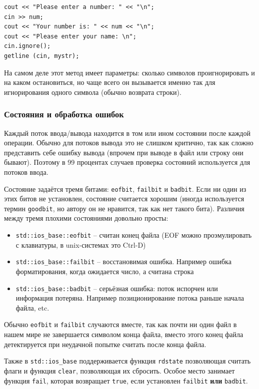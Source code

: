 \documentclass[a4paper,12pt,oneside]{article}
\begin{document}
\begin{lstlisting}
cout << "Please enter a number: " << "\n";
cin >> num;
cout << "Your number is: " << num << "\n";
cout << "Please enter your name: \n";
cin.ignore();
getline (cin, mystr);
\end{lstlisting}

На самом деле этот метод имеет параметры: сколько символов проигнорировать и на каком остановиться, но чаще всего он вызывается именно так для игнорирования одного символа (обычно возврата строки).

\subsubsection{Состояния и обработка ошибок}

Каждый поток ввода/вывода находится в том или ином состоянии после каждой операции. Обычно для потоков вывода это не слишком критично, так как сложно представить себе ошибку вывода (впрочем при выводе в файл или строку они бывают). Поэтому в 99 процентах случаев проверка состояний используется для потоков ввода.

Состояние задаётся тремя битами: \lstinline!eofbit!, \lstinline!failbit! и \lstinline!badbit!. Если ни один из этих битов не установлен, состояние считается хорошим (иногда используется термин \lstinline!goodbit!, но автору он не нравится, так как нет такого бита). Различия между тремя плохими состояниями довольно просты:

\begin{itemize}
\item \lstinline!std::ios_base::eofbit! -- считан конец файла (EOF можно проэмулировать с клавиатуры, в unix-системах это Ctrl-D)
\item \lstinline!std::ios_base::failbit! -- восстановимая ошибка. Например ошибка форматирования, когда ожидается число, а считана строка
\item \lstinline!std::ios_base::badbit! -- серьёзная ошибка: поток испорчен или информация потеряна. Например позиционирование потока раньше начала файла, etc.
\end{itemize}

Обычно \lstinline!eofbit! и \lstinline!failbit! случаются вместе, так как почти ни один файл в нашем мире не завершается символом конца файла, вместо этого конец файла детектируется при неудачной попытке считать после конца файла.

Также в \lstinline!std::ios_base! поддерживается функция \lstinline!rdstate! позволяющая считать флаги и функция \lstinline!clear!, позволяющая их сбросить. Особое место занимает функция \lstinline!fail!, которая возвращает \lstinline!true!, если установлен \lstinline!failbit! \textbf{или} \lstinline!badbit!.
\end{document}
